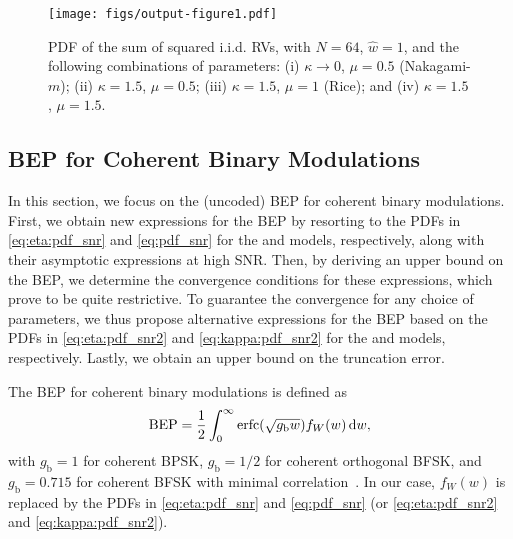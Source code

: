 \documentclass[journal,twocolumn]{IEEEtran}
\begin{document}
\begin{figure}[t]
\centering
\texttt{[image: figs/output-figure1.pdf]}
\caption{\ac{PDF} of the sum of squared \ac{i.i.d.} \km{} \acp{RV}, with $N=64$, $\hat{w}=1$, and the following combinations of parameters: (i) $\kappa \rightarrow 0$, $\mu = 0.5$ (Nakagami-$m$); (ii) $\kappa = 1.5$, $\mu = 0.5$; (iii) $\kappa = 1.5$, $\mu = 1$ (Rice); and (iv) $\kappa = 1.5$, $\mu = 1.5$.}
\label{fig:pdf-kappa}
\end{figure}


\subsection{\ac{BEP} for Coherent Binary Modulations}

In this section, we focus on the (uncoded) \ac{BEP} for coherent binary modulations. First, we obtain new expressions for the \ac{BEP} by resorting to the \acp{PDF} in \eqref{eq:eta:pdf_snr} and \eqref{eq:pdf_snr} for the \Ehm{} and \km{} models, respectively, along with their asymptotic expressions at high \ac{SNR}. Then, by deriving an upper bound on the \ac{BEP}, we determine the convergence conditions for these expressions, which prove to be quite restrictive. To guarantee the convergence for any choice of parameters, we thus propose alternative expressions for the \ac{BEP} based on the \acp{PDF} in \eqref{eq:eta:pdf_snr2} and \eqref{eq:kappa:pdf_snr2} for the \Ehm{} and \km{} models, respectively. Lastly, we obtain an upper bound on the truncation error.

The \ac{BEP} for coherent binary modulations is defined as~\cite[Eq.~(9.3)]{Sim05}
\begin{align} \label{eq:pb}
    \textrm{BEP} = \frac{1}{2}\int_{0}^{\infty}\mathrm{erfc}(\sqrt{g_{\textrm{b}} w}) f_{W}(w) \mathop{}\!\mathrm{d} w,
\end{align}
with $g_{\textrm{b}} = 1$ for coherent \ac{BPSK}, $g_{\textrm{b}} = 1/2$ for coherent orthogonal \ac{BFSK}, and $g_{\textrm{b}} = 0.715$ for coherent \ac{BFSK} with minimal correlation~\cite{Sim05}. In our case, $f_{W}(w)$ is replaced by the \acp{PDF} in \eqref{eq:eta:pdf_snr} and \eqref{eq:pdf_snr} (or \eqref{eq:eta:pdf_snr2} and \eqref{eq:kappa:pdf_snr2}).

\smallskip
\end{document}
